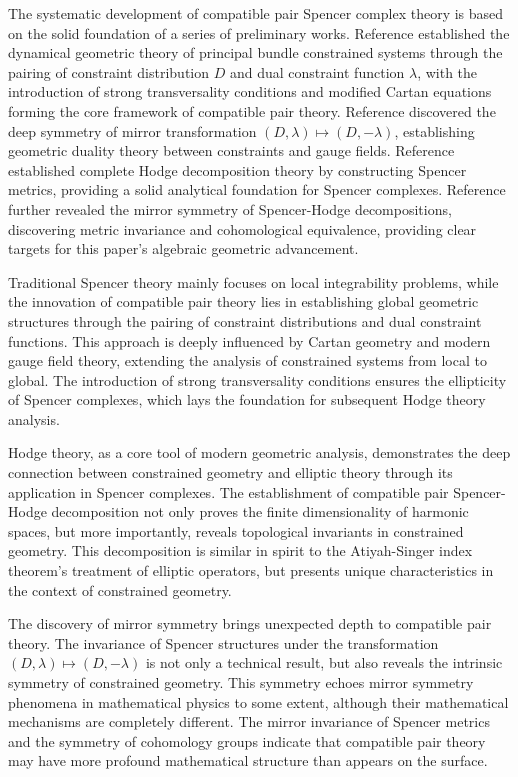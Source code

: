 \documentclass[a4paper,12pt]{extarticle}
\theoremstyle{definition}
\begin{document}
The systematic development of compatible pair Spencer complex theory is based on the solid foundation of a series of preliminary works\cite{zheng2025dynamical,zheng2025geometric,zheng2025constructing,zheng2025mirror}. Reference\cite{zheng2025dynamical} established the dynamical geometric theory of principal bundle constrained systems through the pairing of constraint distribution $D$ and dual constraint function $\lambda$, with the introduction of strong transversality conditions and modified Cartan equations forming the core framework of compatible pair theory. Reference\cite{zheng2025geometric} discovered the deep symmetry of mirror transformation $(D,\lambda) \mapsto (D,-\lambda)$, establishing geometric duality theory between constraints and gauge fields. Reference\cite{zheng2025constructing} established complete Hodge decomposition theory by constructing Spencer metrics, providing a solid analytical foundation for Spencer complexes. Reference\cite{zheng2025mirror} further revealed the mirror symmetry of Spencer-Hodge decompositions, discovering metric invariance and cohomological equivalence, providing clear targets for this paper's algebraic geometric advancement.

Traditional Spencer theory mainly focuses on local integrability problems, while the innovation of compatible pair theory lies in establishing global geometric structures through the pairing of constraint distributions and dual constraint functions. This approach is deeply influenced by Cartan geometry\cite{sharpe1997differential} and modern gauge field theory, extending the analysis of constrained systems from local to global. The introduction of strong transversality conditions ensures the ellipticity of Spencer complexes, which lays the foundation for subsequent Hodge theory analysis.

Hodge theory, as a core tool of modern geometric analysis\cite{warner1983foundations}, demonstrates the deep connection between constrained geometry and elliptic theory through its application in Spencer complexes. The establishment of compatible pair Spencer-Hodge decomposition not only proves the finite dimensionality of harmonic spaces, but more importantly, reveals topological invariants in constrained geometry. This decomposition is similar in spirit to the Atiyah-Singer index theorem\cite{atiyah1963index}'s treatment of elliptic operators, but presents unique characteristics in the context of constrained geometry.

The discovery of mirror symmetry brings unexpected depth to compatible pair theory. The invariance of Spencer structures under the transformation $(D,\lambda) \mapsto (D,-\lambda)$ is not only a technical result, but also reveals the intrinsic symmetry of constrained geometry. This symmetry echoes mirror symmetry phenomena in mathematical physics\cite{strominger1996mirror} to some extent, although their mathematical mechanisms are completely different. The mirror invariance of Spencer metrics and the symmetry of cohomology groups indicate that compatible pair theory may have more profound mathematical structure than appears on the surface.
\end{document}
